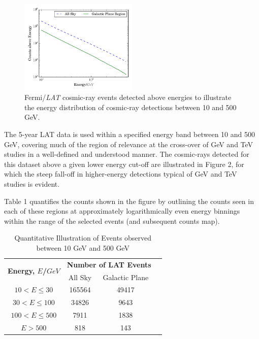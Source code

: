 \documentclass{PoS}
\begin{document}
\begin{figure}
  \begin{center}
      \includegraphics[width=0.5\textwidth]{figures/counts.pdf}
  \caption{Fermi/\textit{LAT} cosmic-ray events detected above energies to illustrate the energy distribution of cosmic-ray detections between 10 and 500 GeV.}
  \end{center}
\end{figure}

The 5-year LAT data is used within a specified energy band between 10 and 500 GeV, covering much of the region of relevance at the cross-over of GeV and TeV studies in a well-defined and understood manner. The cosmic-rays detected for this dataset above a given lower energy cut-off are illustrated in Figure 2, for which the steep fall-off in higher-energy detections typical of GeV and TeV studies is evident.

Table 1 quantifies the counts shown in the figure by outlining the counts seen in each of these regions at approximately logarithmically even energy binnings within the range of the selected events (and subsequent counts map).

\begin{table}
\centering
\begin{tabular}{|c|c|c|c|}
\hline
\multirow{2}{*}{\textbf{Energy, $E$/$GeV$}} & \multicolumn{2}{|c|}{\textbf{Number of LAT Events}}\\
 & All Sky & Galactic Plane \\\hline
$10 < E \leq 30$ & 165564 & 49417 \\\hline
$30 < E \leq 100$ & 34826 & 9643 \\\hline
$100 < E \leq 500$ & 7911 & 1838 \\\hline
$ E > 500$ & 818 & 143 \\\hline
\end{tabular}
\caption{Quantitative Illustration of Events observed between 10 GeV and 500 GeV}
\end{table}
\end{document}
